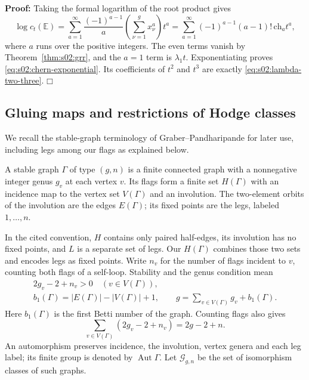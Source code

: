 \documentclass[a4paper,10pt]{article}
\numberwithin{equation}{section}
\newcommand{\EE}{\mathbb{E}}
\theoremstyle{paperplain}
\theoremstyle{paperremark}
\theoremstyle{paperplain}
\newenvironment{prf}{\noindent \textbf{Proof: }}{\hfill $\mdlgwhtsquare$\par\addvspace{0.5\baselineskip}}
\begin{document}
\begin{prf}
Taking the formal logarithm of the root product gives
\[
\log c_t(\EE)
=\sum_{a=1}^{\infty}\frac{(-1)^{a-1}}{a}
\left(\sum_{\nu=1}^g x_\nu^a\right)t^a
=\sum_{a=1}^{\infty}(-1)^{a-1}(a-1)!\,
\mathrm{ch}_a t^a,
\]
where $a$ runs over the positive integers.  The even terms vanish by
Theorem~\ref{thm:s02:grr}, and the $a=1$ term is $\lambda_1t$.
Exponentiating proves \eqref{eq:s02:chern-exponential}.  Its
coefficients of $t^2$ and $t^3$ are exactly
\eqref{eq:s02:lambda-two-three}.
\end{prf}

\subsection{Gluing maps and restrictions of Hodge classes}
\label{subsec:s02:03}

We recall the stable-graph terminology of Graber--Pandharipande
\cite[Appendix A.1]{GP03} for later use, including legs among our
flags as explained below.

A stable graph $\Gamma$ of type $(g,n)$ is a finite connected graph
with a nonnegative integer genus $g_v$ at each vertex $v$.  Its flags
form a finite set $H(\Gamma)$ with an incidence map to the vertex set
$V(\Gamma)$ and an involution.  The two-element orbits of the
involution are the edges $E(\Gamma)$; its fixed points are the legs,
labeled $1,\ldots,n$.

In the cited convention, $H$ contains only paired half-edges, its
involution has no fixed points, and $L$ is a separate set of legs.
Our $H(\Gamma)$ combines those two sets and encodes legs as fixed
points.  Write $n_v$ for the number of flags incident
to $v$, counting both flags of a self-loop.  Stability and the genus
condition mean
\begin{equation}
\label{eq:s02:graph-genus}
\begin{gathered}
2g_v-2+n_v>0\quad(v\in V(\Gamma)),\\
b_1(\Gamma)=|E(\Gamma)|-|V(\Gamma)|+1,\qquad
g=\sum_{v\in V(\Gamma)}g_v+b_1(\Gamma).
\end{gathered}
\end{equation}
Here $b_1(\Gamma)$ is the first Betti number of the graph.  Counting
flags also gives
\begin{equation}
\label{eq:s02:graph-stability-sum}
\sum_{v\in V(\Gamma)}(2g_v-2+n_v)=2g-2+n.
\end{equation}
An automorphism preserves incidence, the involution, vertex genera and
each leg label; its finite group is denoted by
$\operatorname{Aut}\Gamma$.  Let $\mathcal G_{g,n}$ be the set of
isomorphism classes of such graphs.
\end{document}
